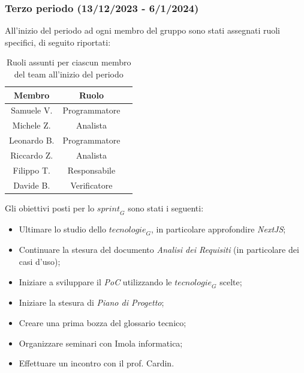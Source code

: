 \subsubsection{Terzo periodo (13/12/2023 - 6/1/2024)}
All'inizio del periodo ad ogni membro del gruppo sono stati assegnati ruoli specifici, di seguito riportati:
\begin{table}[H]
\centering
\begin{tabular}{|c|c|c|}
\hline
\textbf{Membro} & \textbf{Ruolo} \\
\hline
Samuele V. & Programmatore \\
\hline
Michele Z. & Analista \\
\hline
Leonardo B. & Programmatore \\
\hline
Riccardo Z. & Analista \\
\hline
Filippo T. & Responsabile \\
\hline
Davide B. & Verificatore \\
\hline
\end{tabular}
\caption{Ruoli assunti per ciascun membro del team all'inizio del periodo}
\end{table}


Gli obiettivi posti per lo $\textit{sprint}_G$ sono stati i seguenti:
\begin{itemize}
    \item Ultimare lo studio dello $\textit{tecnologie}_G$, in particolare approfondire \emph{NextJS};
    \item Continuare la stesura del documento \emph{Analisi dei Requisiti} (in particolare dei casi d'uso);
    \item Iniziare a sviluppare il \emph{PoC} utilizzando le $\textit{tecnologie}_G$ scelte;
    \item Iniziare la stesura di \emph{Piano di Progetto};
    \item Creare una prima bozza del glossario tecnico;
    \item Organizzare seminari con Imola informatica;
    \item Effettuare un incontro con il prof. Cardin.
\end{itemize} 

